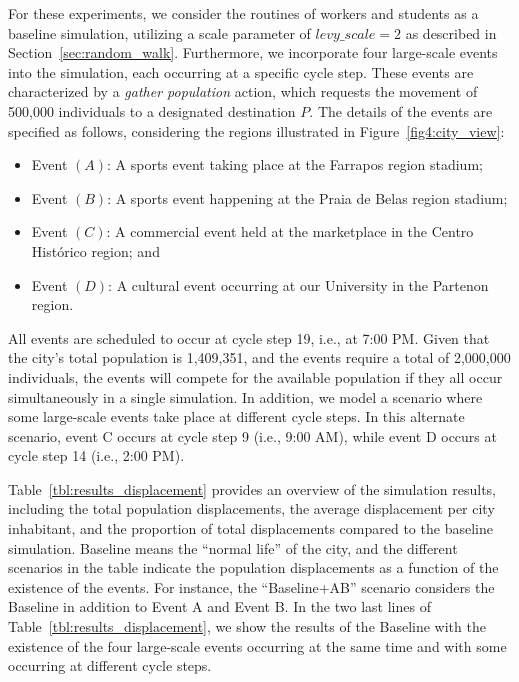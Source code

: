 For these experiments, we consider the routines of workers and students as a baseline simulation, utilizing a scale parameter of $levy\_scale = 2$ as described in Section~\ref{sec:random_walk}.
Furthermore, we incorporate four large-scale events into the simulation, each occurring at a specific cycle step. These events are characterized by a \textit{gather population} action, which requests the movement of 500,000 individuals to a designated destination $P$. The details of the events are specified as follows, considering the regions illustrated in Figure~\ref{fig4:city_view}: 

\begin{itemize}
    \item Event $(A)$: A sports event taking place at the Farrapos region stadium;
    \item Event $(B)$: A sports event happening at the Praia de Belas region stadium;
    \item Event $(C)$: A commercial event held at the marketplace in the Centro Histórico region; and
    \item Event $(D)$: A cultural event occurring at our University in the Partenon region.
\end{itemize}

All events are scheduled to occur at cycle step 19, i.e., at 7:00 PM. Given that the city's total population is 1,409,351, and the events require a total of 2,000,000 individuals, the events will compete for the available population if they all occur simultaneously in a single simulation.
In addition, we model a scenario where some large-scale events take place at different cycle steps. In this alternate scenario, event C occurs at cycle step 9 (i.e., 9:00 AM), while event D occurs at cycle step 14 (i.e., 2:00 PM).

Table~\ref{tbl:results_displacement} provides an overview of the simulation results, including the total population displacements, the average displacement per city inhabitant, and the proportion of total displacements compared to the baseline simulation. Baseline means the ``normal life'' of the city, and the different scenarios in the table indicate the population displacements as a function of the existence of the events. For instance, the ``Baseline+AB'' scenario considers the Baseline in addition to Event A and Event B. In the two last lines of Table~\ref{tbl:results_displacement}, we show the results of the Baseline with the existence of the four large-scale events occurring at the same time and with some occurring at different cycle steps.


